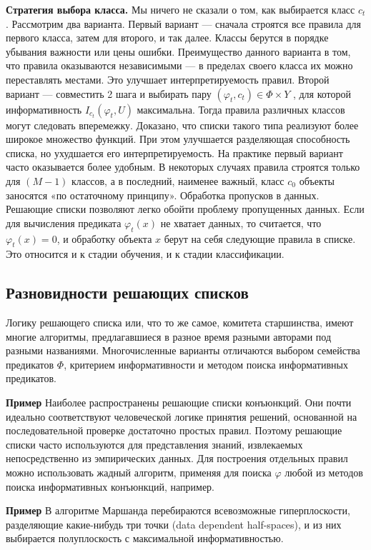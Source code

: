 \textbf{Стратегия выбора класса.} Мы ничего не сказали о том, как выбирается класс $c_t$. Рассмотрим два варианта.
Первый вариант — сначала строятся все правила для первого класса, затем для второго, и так далее. Классы берутся в порядке убывания важности или цены ошибки. Преимущество данного варианта в том, что правила оказываются независимыми — в пределах своего класса их можно переставлять местами. Это улучшает
интерпретируемость правил.
Второй вариант — совместить 2 шага и выбирать пару $(\varphi_t
, c_t) \in \Phi \times Y$ , для
которой информативность $I_{c_t}(\varphi_t, U)$ максимальна. Тогда правила различных классов
могут следовать вперемежку. Доказано, что списки такого типа реализуют более широкое множество функций. При этом улучшается разделяющая способность
списка, но ухудшается его интерпретируемость.
На практике первый вариант часто оказывается более удобным. В некоторых случаях правила строятся только для $(M − 1)$ классов, а в последний, наименее
важный, класс $c_0$ объекты заносятся «по остаточному принципу».
Обработка пропусков в данных. Решающие списки позволяют легко обойти проблему пропущенных данных. Если для вычисления предиката 
$\varphi_t(x)$ не хватает данных, то считается, что $\varphi_t(x) = 0$, и обработку объекта $x$ берут на себя следующие
правила в списке. Это относится и к стадии обучения, и к стадии классификации.

\subsection{Разновидности решающих списков}
Логику решающего списка или, что то же самое, комитета старшинства, имеют
многие алгоритмы, предлагавшиеся в разное время разными авторами под разными названиями. Многочисленные варианты отличаются выбором семейства предикатов $\Phi$, критерием информативности и методом поиска информативных предикатов.

\textbf{Пример} Наиболее распространены решающие списки конъюнкций. Они почти
идеально соответствуют человеческой логике принятия решений, основанной на последовательной проверке достаточно простых правил. Поэтому решающие списки
часто используются для представления знаний, извлекаемых непосредственно из эмпирических данных. Для построения отдельных правил можно использовать жадный алгоритм, применяя для поиска $\varphi$ любой из методов поиска информативных конъюнкций,
например.

\textbf{Пример} В алгоритме Маршанда перебираются всевозможные гиперплоскости, разделяющие какие-нибудь три точки (data dependent half-spaces), и из них выбирается полуплоскость с максимальной информативностью.


